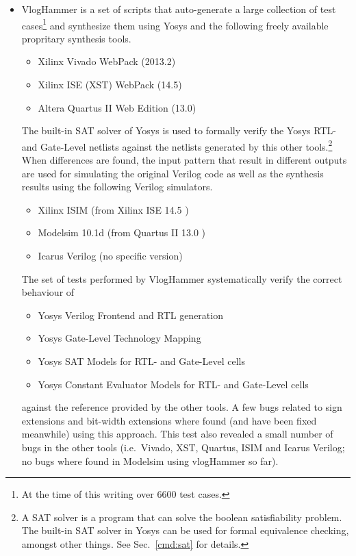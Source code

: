 \begin{itemize}
\item VlogHammer  is a set of scripts that
auto-generate a large collection of test cases\footnote{At the time of this
writing over 6600 test cases.} and synthesize them using Yosys and the
following freely available propritary synthesis tools.
\begin{itemize}
\item Xilinx Vivado WebPack (2013.2) 
\item Xilinx ISE (XST) WebPack (14.5) 
\item Altera Quartus II Web Edition (13.0) 
\end{itemize}
The built-in SAT solver of Yosys is used to formally
verify the Yosys RTL- and Gate-Level netlists against the netlists generated by
this other tools.\footnote{A SAT solver is a program that can solve the boolean
satisfiability problem. The built-in SAT solver in Yosys can be used for formal
equivalence checking, amongst other things. See Sec.~\ref{cmd:sat} for details.}
When differences are found, the input pattern that result in
different outputs are used for simulating the original Verilog code as well as
the synthesis results using the following Verilog simulators.
\begin{itemize}
\item Xilinx ISIM (from Xilinx ISE 14.5 )
\item Modelsim 10.1d (from Quartus II 13.0 )
\item Icarus Verilog (no specific version)
\end{itemize}
The set of tests performed by VlogHammer systematically verify the correct
behaviour of
\begin{itemize}
\item Yosys Verilog Frontend and RTL generation
\item Yosys Gate-Level Technology Mapping
\item Yosys SAT Models for RTL- and Gate-Level cells
\item Yosys Constant Evaluator Models for RTL- and Gate-Level cells
\end{itemize}
against the reference provided by the other tools. A few bugs related to sign
extensions and bit-width extensions where found (and have been fixed meanwhile)
using this approach. This test also revealed a small number of bugs in the
other tools (i.e.~Vivado, XST, Quartus, ISIM and Icarus Verilog; no bugs where
found in Modelsim using vlogHammer so far).
\end{itemize}

